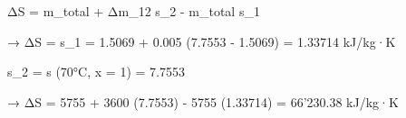 ΔS = m_total + Δm_12 s_2 - m_total s_1  

→ ΔS = s_1 = 1.5069 + 0.005 (7.7553 - 1.5069) = 1.33714 kJ/kg·K  

s_2 = s (70°C, x = 1) = 7.7553  

→ ΔS = 5755 + 3600 (7.7553) - 5755 (1.33714) = 66'230.38 kJ/kg·K